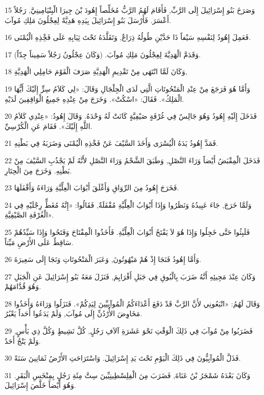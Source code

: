 \par 15 وَصَرَخَ بَنُو إِسْرَائِيلَ إِلَى الرَّبِّ, فَأَقَامَ لَهُمُ الرَّبُّ مُخَلِّصاً إِهُودَ بْنَ جِيرَا الْبِنْيَامِينِيَّ, رَجُلاً أَعْسَرَ. فَأَرْسَلَ بَنُو إِسْرَائِيلَ بِيَدِهِ هَدِيَّةً لِعِجْلُونَ مَلِكِ مُوآبَ.
\par 16 فَعَمِلَ إِهُودُ لِنَفْسِهِ سَيْفاً ذَا حَدَّيْنِ طُولُهُ ذِرَاعٌ, وَتَقَلَّدَهُ تَحْتَ ثِيَابِهِ عَلَى فَخِْذِهِ الْيُمْنَى.
\par 17 وَقَدَمَّ الْهَدِيَّةَ لِعِجْلُونَ مَلِكِ مُوآبَ. (وَكَانَ عِجْلُونُ رَجُلاً سَمِيناً جِدّاً).
\par 18 وَكَانَ لَمَّا انْتَهَى مِنْ تَقْدِيمِ الْهَدِيَّةِ صَرَفَ الْقَوْمَ حَامِلِي الْهَدِيَّةِ,
\par 19 وَأَمَّا هُوَ فَرَجَعَ مِنْ عِنْدِ الْمَنْحُوتَاتِ الَّتِي لَدَى الْجِلْجَالِ وَقَالَ: «لِي كَلاَمُ سِرٍّ إِلَيْكَ أَيُّهَا الْمَلِكُ». فَقَالَ: «اسْكُتْ». وَخَرَجَ مِنْ عِنْدِهِ جَمِيعُ الْوَاقِفِينَ لَدَيْهِ.
\par 20 فَدَخَلَ إِلَيْهِ إِهُودُ وَهُوَ جَالِسٌ فِي غُرْفَةٍ صَيْفِيَّةٍ كَانَتْ لَهُ وَحْدَهُ. وَقَالَ إِهُودُ: «عِنْدِي كَلاَمُ اللَّهِ إِلَيْكَ». فَقَامَ عَنِ الْكُرْسِيِّ.
\par 21 فَمَدَّ إِهُودُ يَدَهُ الْيُسْرَى وَأَخَذَ السَّيْفَ عَنْ فَخْذِهِ الْيُمْنَى وَضَرَبَهُ فِي بَطْنِهِ.
\par 22 فَدَخَلَ الْمِقْبَضُ أَيْضاً وَرَاءَ النَّصْلِ, وَطَبَقَ الشَّحْمُ وَرَاءَ النَّصْلِ لأَنَّهُ لَمْ يَجْذُبِ السَّيْفَ مِنْ بَطْنِهِ. وَخَرَجَ مِنَ الْحِتَارِ.
\par 23 فَخَرَجَ إِهُودُ مِنَ الرِّوَاقِ وَأَغْلَقَ أَبْوَابَ الْعِلِّيَّةِ وَرَاءَهُ وَأَقْفَلَهَا.
\par 24 وَلَمَّا خَرَجَ, جَاءَ عَبِيدُهُ وَنَظَرُوا وَإِذَا أَبْوَابُ الْعِلِّيَّةِ مُقْفَلَةٌ, فَقَالُوا: «إِنَّهُ مُغَطٍّ رِجْلَيْهِ فِي الْغُرْفَةِ الصَّيْفِيَّةِ».
\par 25 فَلَبِثُوا حَتَّى خَجِلُوا وَإِذَا هُوَ لاَ يَفْتَحُ أَبْوَابَ الْعِلِّيَّةِ. فَأَخَذُوا الْمِفْتَاحَ وَفَتَحُوا وَإِذَا سَيِّدُهُمْ سَاقِطٌ عَلَى الأَرْضِ مَيِّتاً.
\par 26 وَأَمَّا إِهُودُ فَنَجَا إِذْ هُمْ مَبْهُوتُونَ, وَعَبَرَ الْمَنْحُوتَاتِ وَنَجَا إِلَى سَعِيرَةَ.
\par 27 وَكَانَ عِنْدَ مَجِيئِهِ أَنَّهُ ضَرَبَ بِالْبُوقِ فِي جَبَلِ أَفْرَايِمَ, فَنَزَلَ مَعَهُ بَنُو إِسْرَائِيلَ عَنِ الْجَبَلِ وَهُوَ قُدَّامَهُمْ.
\par 28 وَقَالَ لَهُمُ: «اتْبَعُونِي لأَنَّ الرَّبَّ قَدْ دَفَعَ أَعْدَاءَكُمُ الْمُوآبِيِّينَ لِيَدِكُمْ». فَنَزَلُوا وَرَاءَهُ وَأَخَذُوا مَخَاوِضَ الأُرْدُنِّ إِلَى مُوآبَ, وَلَمْ يَدَعُوا أَحَداً يَعْبُرُ.
\par 29 فَضَرَبُوا مِنْ مُوآبَ فِي ذَلِكَ الْوَقْتِ نَحْوَ عَشَرَةِ آلاَفِ رَجُلٍ, كُلَّ نَشِيطٍ وَكُلَّ ذِي بَأْسٍ, وَلَمْ يَنْجُ أَحَدٌ.
\par 30 فَذَلَّ الْمُوآبِيُّونَ فِي ذَلِكَ الْيَوْمِ تَحْتَ يَدِ إِسْرَائِيلَ. وَاسْتَرَاحَتِ الأَرْضُ ثَمَانِينَ سَنَةً.
\par 31 وَكَانَ بَعْدَهُ شَمْجَرُ بْنُ عَنَاةَ, فَضَرَبَ مِنَ الْفِلِسْطِينِيِّينَ سِتَّ مِئَةِ رَجُلٍ بِمِنْخَسِ الْبَقَرِ. وَهُوَ أَيْضاً خَلَّصَ إِسْرَائِيلَ.

